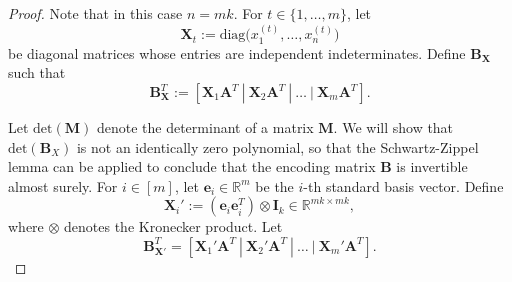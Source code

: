 \documentclass[journal,draftcls,onecolumn]{IEEEtran}
\theoremstyle{mystyle}
\newcommand{\bfD}{\mathbf{D}}
\newcommand{\bfX}{\mathbf{X}}
\newcommand{\bfA}{\mathbf{A}}
\newcommand{\bfB}{\mathbf{B}}
\newcommand{\bfI}{\mathbf{I}}
\newcommand{\bfM}{\mathbf{M}}
\begin{document}
\begin{proof}
Note that in this case $n = mk$. For $t \in \{1,\dots,m \}$, let
\[
\bfX_t := \mathrm{diag}\big(x^{(t)}_1,\dots,x^{(t)}_n\big)
\]
be diagonal matrices whose entries are independent indeterminates. Define $\bfB_{\bfX}$ such that
\begin{equation}\label{eq:poly}
\mathbf{B}_{\bfX}^T := [ \bfX_1 \bfA^T ~|~ \bfX_2 \bfA^T ~|~ \dots ~|~ \bfX_m \bfA^T].
\end{equation}

Let $\text{det}(\bfM)$ denote the determinant of a matrix $\bfM$. We will show that $\text{det}(\bfB_X)$ is not an identically zero polynomial, so that the Schwartz-Zippel lemma \cite{zippel1979probabilistic} can be applied to conclude that the encoding matrix $\mathbf{B}$ is invertible almost surely. For $i \in [m]$,
let $\mathbf{e}_i \in \mathbb{R}^m$ be the $i$-th standard basis vector.
Define
\[
\bfX_i' := (\mathbf{e}_i \mathbf{e}_i^T) \otimes \bfI_k \in \mathbb{R}^{mk\times mk},
\]
where $\otimes$ denotes the Kronecker product. Let 
\begin{equation}
\mathbf{B}_{\bfX'}^T = [ \bfX_1' \bfA^T ~|~ \bfX_2' \bfA^T ~|~ \dots ~|~ \bfX_m' \bfA^T].
\end{equation}


\end{proof}
\end{document}
